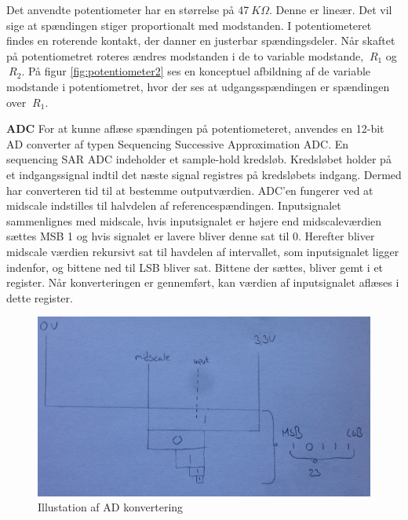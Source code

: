 \noindent Det anvendte potentiometer har en størrelse på 47\(\ K\Omega\). Denne er lineær. Det vil sige at spændingen stiger proportionalt med modstanden. I potentiometeret findes en roterende kontakt, der danner en justerbar spændingsdeler. Når skaftet på potentiometret roteres ændres modstanden i de to variable modstande, \(\ R_{1}\) og  \(\ R_{2}\). På figur \ref{fig:potentiometer2} ses en konceptuel afbildning af de variable modstande i potentiometret, hvor der ses at udgangsspændingen er spændingen over \(\ R_{1}\). \newline

\noindent \textbf{ADC} \newline
For at kunne aflæse spændingen på potentiometeret, anvendes en 12-bit AD converter af typen Sequencing Successive Approximation ADC. En sequencing SAR ADC indeholder et sample-hold kredsløb. Kredsløbet holder på et indgangssignal indtil det næste signal registres på kredsløbets indgang. Dermed har converteren tid til at bestemme outputværdien. \newline \newline
\noindent ADC'en fungerer ved at midscale indstilles til halvdelen af referencespændingen. Inputsignalet sammenlignes med midscale, hvis inputsignalet er højere end midscaleværdien sættes MSB 1 og hvis signalet er lavere bliver denne sat til 0. Herefter bliver midscale værdien rekursivt sat til havdelen af intervallet, som inputsignalet ligger indenfor, og bittene ned til LSB bliver sat. Bittene der sættes, bliver gemt i et register. Når konverteringen er gennemført, kan værdien af inputsignalet aflæses i dette register. 

\begin{figure}[H]
	\centering
	\includegraphics[width=\textwidth]{DesignOgImplementering/images/ADC}
	\caption{Illustation af AD konvertering}
	\label{fig:ADC1}
	
\end{figure}

